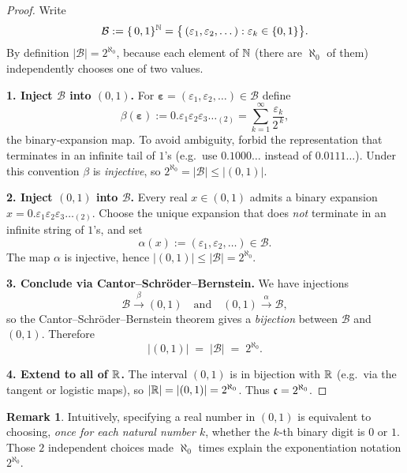 \documentclass[12pt]{article}
\theoremstyle{definition} %
\newtheorem{remark}{Remark}
\theoremstyle{plain} %
\begin{document}
    \begin{proof}
    Write
    \[
      \mathcal B := \{\,0,1\}^{\Bbb N}
         =\bigl\{\,(\varepsilon_1,\varepsilon_2,\dots):
                  \varepsilon_k\in\{0,1\}\bigr\}.
    \]
    By definition $|\mathcal B| = 2^{\aleph_0}$, because each element of
    $\Bbb N$ (there are $\aleph_0$ of them) independently chooses one of
    two values.
    
    \vspace{4pt}
    \textbf{1.  Inject $\mathcal B$ into $(0,1)$.}
    For
    $\boldsymbol\varepsilon=(\varepsilon_1,\varepsilon_2,\dots)\in\mathcal B$
    define
    \[
       \beta(\boldsymbol\varepsilon)
       := 0.\varepsilon_1\varepsilon_2\varepsilon_3\dots_{\!(2)}
       = \sum_{k=1}^{\infty}\frac{\varepsilon_k}{2^{\,k}},
    \]
    the binary‑expansion map.
    To avoid ambiguity, forbid the representation that terminates in an
    infinite tail of $1$’s (e.g.\ use $0.1000\ldots$ instead of
    $0.0111\ldots$).
    Under this convention $\beta$ is \emph{injective}, so
    $2^{\aleph_0}=|\mathcal B|\le |(0,1)|$.
    
    \vspace{4pt}
    \textbf{2.  Inject $(0,1)$ into $\mathcal B$.}
    Every real $x\in(0,1)$ admits a binary expansion
    $x=0.\varepsilon_1\varepsilon_2\varepsilon_3\dots_{\!(2)}$.
    Choose the unique expansion that does \emph{not} terminate in an
    infinite string of $1$’s, and set
    \[
      \alpha(x) := (\varepsilon_1,\varepsilon_2,\dots)\in\mathcal B .
    \]
    The map $\alpha$ is injective, hence
    $|(0,1)|\le |\mathcal B| = 2^{\aleph_0}$.
    
    \vspace{4pt}
    \textbf{3.  Conclude via Cantor–Schröder–Bernstein.}
    We have injections
    \[
        \mathcal B \xrightarrow{\;\beta\;} (0,1)
        \quad\text{and}\quad
        (0,1)\xrightarrow{\;\alpha\;}\mathcal B,
    \]
    so the Cantor–Schröder–Bernstein theorem
    gives a \emph{bijection} between $\mathcal B$ and $(0,1)$.
    Therefore
    \[
       |(0,1)| \;=\; |\mathcal B|
       \;=\; 2^{\aleph_0}.
    \]
    
    \vspace{4pt}
    \textbf{4.  Extend to all of $\Bbb R$.}
    The interval $(0,1)$ is in bijection with $\Bbb R$
    (e.g.\ via the tangent or logistic maps), so
    $|\Bbb R|=|(0,1)|=2^{\aleph_0}$.
    Thus $\frak c = 2^{\aleph_0}$.
    \end{proof}
    
    \begin{remark}
    Intuitively, specifying a real number in $(0,1)$ is equivalent to
    choosing, \emph{once for each natural number $k$}, whether the
    $k$‑th binary digit is $0$ or $1$.
    Those $2$ independent choices made $\aleph_0$ times explain the
    exponentiation notation \(2^{\aleph_0}\).
    \end{remark}
\end{document}
